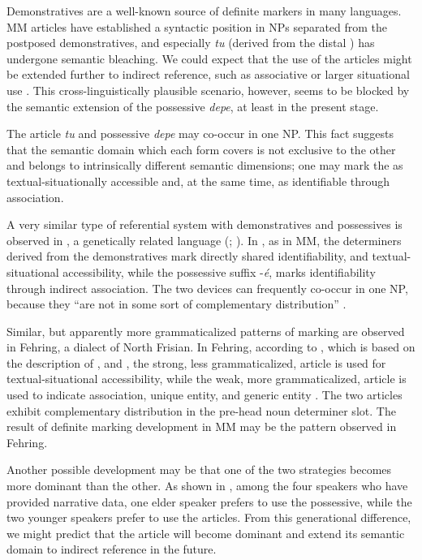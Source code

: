 \documentclass[output=paper
,modfonts
,nonflat]{langsci/langscibook}
\begin{document}
Demonstratives are a well-known source of definite markers in many languages. MM articles have established a syntactic position in NPs separated from the postposed demonstratives, and especially \textit{tu} (derived from the distal ) has undergone semantic bleaching. We could expect that the use of the articles might be extended further to indirect reference, such as  associative or larger situational use \citep{Hawkins2015}. This cross-linguistically plausible scenario, however, seems to be blocked by the semantic extension of the possessive \textit{depe}, at least in the present stage.

The article \textit{tu} and possessive \textit{depe} may co-occur in one NP. This fact suggests that the semantic domain which each form covers is not exclusive to the other and belongs to intrinsically different semantic dimensions; one may mark the  as textual-situationally accessible and, at the same time, as identifiable through association.

A very similar type of referential system with demonstratives and possessives is observed in , a genetically related language (\citealt{Ewing1995}; \citealt{Ewing2005}). In , as in MM, the determiners derived from the demonstratives mark directly shared identifiability, and textual-situational accessibility, while the possessive suffix -\textit{é}, marks identifiability through indirect association. The two devices can frequently co-occur in one NP, because they “are not in some sort of complementary distribution” \citep[80]{Ewing1995}.

Similar, but apparently more grammaticalized patterns of marking are observed in Fehring, a dialect of North Frisian. In Fehring, according to \citet[161ff]{Lyons1999}, which is based on the description of \citet{Ebert1971a, Ebert1971b}, and \citet{deMulder2011}, the strong, less grammaticalized, article is used for textual-situational accessibility, while the weak, more grammaticalized, article is used to indicate  association, unique entity, and generic entity \citep[529]{deMulder2011}. The two articles exhibit complementary distribution in the pre-head noun determiner slot. The result of definite marking development in MM may be the pattern observed in Fehring.

Another possible development may be that one of the two strategies becomes more dominant than the other. As shown in , among the four speakers who have provided narrative data, one elder speaker prefers to use the possessive, while the two younger speakers prefer to use the articles. From this generational difference, we might predict that the article will become dominant and extend its semantic domain to indirect reference in the future.
\end{document}
